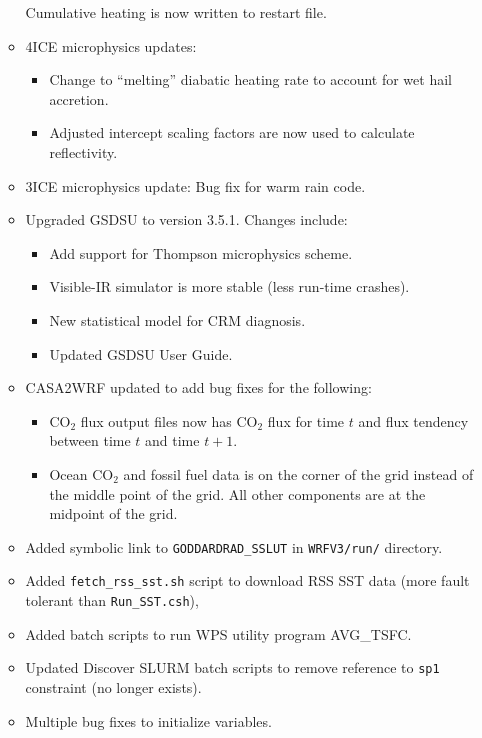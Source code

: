 \begin{itemize}
\begin{itemize}
    Cumulative heating is now written to restart file.
  \item 4ICE microphysics updates:
    \begin{itemize}
    \item Change to ``melting'' diabatic heating rate to account for wet hail
      accretion.
    \item Adjusted intercept scaling factors are now used to calculate 
      reflectivity.
    \end{itemize}
  \item 3ICE microphysics update: Bug fix for warm rain code.
  \item Upgraded GSDSU to version 3.5.1.  Changes include:
    \begin{itemize}
    \item Add support for Thompson microphysics scheme.
    \item Visible-IR simulator is more stable (less run-time crashes).
    \item New statistical model for CRM diagnosis.
    \item Updated GSDSU User Guide.
    \end{itemize}
  \item CASA2WRF updated to add bug fixes for the following:
    \begin{itemize}
    \item CO$_2$ flux output files now has CO$_2$ flux for time $t$ and flux
      tendency between time $t$ and time $t+1$.
    \item Ocean CO$_2$ and fossil fuel data is on the corner of the grid 
      instead of the middle point of the grid.  All other components are at the
      midpoint of the grid.
    \end{itemize}
  \item Added symbolic link to \texttt{GODDARDRAD\_SSLUT} in 
    \texttt{WRFV3/run/} directory.
  \item Added \texttt{fetch\_rss\_sst.sh} script to download RSS SST data 
    (more fault tolerant than \texttt{Run\_SST.csh}), 
  \item Added batch scripts to run WPS utility program AVG\_TSFC.
  \item Updated Discover SLURM batch scripts to remove reference to 
    \texttt{sp1} constraint (no longer exists).
  \item Multiple bug fixes to initialize variables.
  \end{itemize}


\end{itemize}

